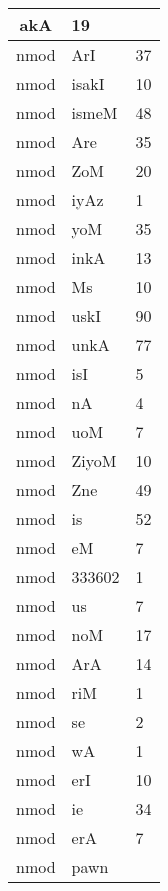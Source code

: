 \documentclass[a4 paper]{article}
\begin{document}
\begin{longtable}{cp{}p{}}
akA & 19\\ \midrule nmod & ArI & 37\\ \midrule nmod & isakI & 10\\ \midrule nmod & ismeM & 48\\ \midrule nmod & Are & 35\\ \midrule nmod & ZoM & 20\\ \midrule nmod & iyAz & 1\\ \midrule nmod & yoM & 35\\ \midrule nmod & inkA & 13\\ \midrule nmod & Ms & 10\\ \midrule nmod & uskI & 90\\ \midrule nmod & unkA & 77\\ \midrule nmod & isI & 5\\ \midrule nmod & nA & 4\\ \midrule nmod & uoM & 7\\ \midrule nmod & ZiyoM & 10\\ \midrule nmod & Zne & 49\\ \midrule nmod & is & 52\\ \midrule nmod & eM & 7\\ \midrule nmod & 333602 & 1\\ \midrule nmod & us & 7\\ \midrule nmod & noM & 17\\ \midrule nmod & ArA & 14\\ \midrule nmod & riM & 1\\ \midrule nmod & se & 2\\ \midrule nmod & wA & 1\\ \midrule nmod & erI & 10\\ \midrule nmod & ie & 34\\ \midrule nmod & erA & 7\\ \midrule nmod & pawn
\end{longtable}
\end{document}

